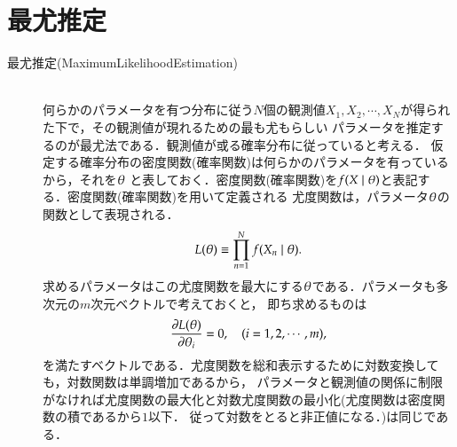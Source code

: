 \documentclass[a4j,papersize,disablejfam,slide,14pt]{jsarticle}
\def\Vector#1{{\boldmath #1}} %
\begin{document}
\section{最尤推定}
	\begin{description}
    	\item[最尤推定({\rm Maximum\quad Likelihood\quad Estimation})]\mbox{}\\
        	何らかのパラメータを有つ分布に従う$N$個の観測値$X_1, X_2, \cdots, X_N$が得られた下で，その観測値が現れるための最も尤もらしい
            パラメータを推定するのが最尤法である．観測値が或る確率分布に従っていると考える．
            仮定する確率分布の密度関数(確率関数)は何らかのパラメータを有っているから，それを$\Vector{\theta}$
            と表しておく．密度関数(確率関数)を$f(X \mid \Vector{\theta})$と表記する．密度関数(確率関数)を用いて定義される
            尤度関数は，パラメータ$\Vector{\theta}$の関数として表現される．
            \begin{align}
            	L(\Vector{\theta}) \equiv \prod_{n=1}^{N} f(X_n \mid \Vector{\theta}).
            \end{align}
            求めるパラメータはこの尤度関数を最大にする$\Vector{\theta}$である．パラメータも多次元の$m$次元ベクトルで考えておくと，
            即ち求めるものは
            \begin{align}
            	\frac{\partial L(\Vector{\theta})}{\partial \theta_i} = 0, \quad (i = 1, 2, \cdots, m),
            \end{align}
            を満たすベクトルである．尤度関数を総和表示するために対数変換しても，対数関数は単調増加であるから，
            パラメータと観測値の関係に制限がなければ尤度関数の最大化と対数尤度関数の最小化(尤度関数は密度関数の積であるから$1$以下．
            従って対数をとると非正値になる．)は同じである．
    \end{description}
\end{document}
